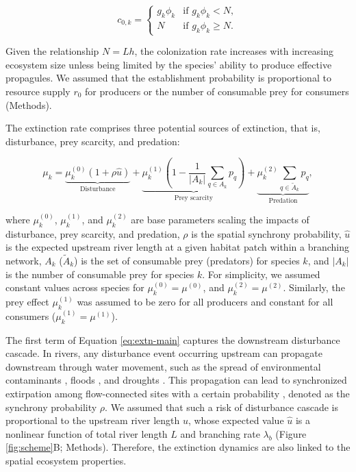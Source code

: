 \documentclass[11pt, class=article, crop=false]{standalone}
\begin{document}
\begin{equation}
    c_{0, k} = 
    \begin{cases}
        g_k \phi_k & \text{if $g_k \phi_k < N$},\\
        N & \text{if $g_k \phi_k \ge N$}.
    \end{cases}
    \label{eq:c0-prod}
\end{equation}

Given the relationship $N = Lh$, the colonization rate increases with increasing ecosystem size unless being limited by the species' ability to produce effective propagules.
We assumed that the establishment probability is proportional to resource supply $r_0$ for producers or the number of consumable prey for consumers (Methods).

The extinction rate comprises three potential sources of extinction, that is, disturbance, prey scarcity, and predation:

\begin{equation}
    \mu_{k} = 
        \underbrace{\mu_{k}^{(0)} (1 + \rho \hat{u})}_{\text{Disturbance}} + 
        \underbrace{\mu_{k}^{(1)} \left(1 - \frac{1}{|A_{k}|}\sum_{q\in A_{k}} p_{q} \right)}_{\text{Prey scarcity}} + 
        \underbrace{\mu_{k}^{(2)} \sum_{q \in \tilde{A}_{k}} p_{q}}_{\text{Predation}},
    \label{eq:extn-main}    
\end{equation}

where $\mu_k^{(0)}$, $\mu_k^{(1)}$, and $\mu_k^{(2)}$ are base parameters scaling the impacts of disturbance, prey scarcity, and predation, $\rho$ is the spatial synchrony probability, $\hat{u}$ is the expected upstream river length at a given habitat patch within a branching network, $A_{k}$ ($\tilde{A}_{k}$) is the set of consumable prey (predators) for species $k$, and $|A_{k}|$ is the number of consumable prey for species $k$.
For simplicity, we assumed constant values across species for $\mu_k^{(0)} = \mu^{(0)}$, and $\mu_k^{(2)} = \mu^{(2)}$.
Similarly, the prey effect $\mu_k^{(1)}$ was assumed to be zero for all producers and constant for all consumers ($\mu_k^{(1)} = \mu^{(1)}$).

The first term of Equation \ref{eq:extn-main} captures the downstream disturbance cascade.
In rivers, any disturbance event occurring upstream can propagate downstream through water movement, such as the spread of environmental contaminants \citep{massoudieh_biogeochemical_2010}, floods \citep{swanson_flood_1998, nakamura_disturbance_2000}, and droughts \citep{sarremejane_drought_2021}.
This propagation can lead to synchronized extirpation among flow-connected sites with a certain probability \citep{larsen_geography_2021, sarremejane_drought_2021}, denoted as the synchrony probability $\rho$. 
We assumed that such a risk of disturbance cascade is proportional to the upstream river length $u$, whose expected value $\hat{u}$ is a nonlinear function of total river length $L$ and branching rate $\lambda_b$ (Figure \ref{fig:scheme}B; Methods).
Therefore, the extinction dynamics are also linked to the spatial ecosystem properties.
\end{document}
